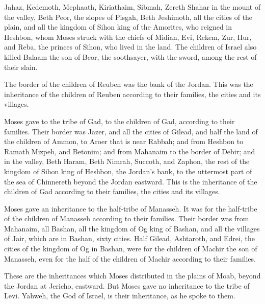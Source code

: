 {Jahaz, Kedemoth, Mephaath,
Kiriathaim, Sibmah, Zereth Shahar in the mount of the valley,
Beth Peor, the slopes of Pisgah, Beth Jeshimoth,
all the cities of the plain, and all the kingdom of Sihon king of the Amorites, who reigned in Heshbon, whom Moses struck with the chiefs of Midian, Evi, Rekem, Zur, Hur, and Reba, the princes of Sihon, who lived in the land.
The children of Israel also killed Balaam the son of Beor, the soothsayer, with the sword, among the rest of their slain.
\par }{\PP {}The border of the children of Reuben was the bank of the Jordan. This was the inheritance of the children of Reuben according to their families, the cities and its villages.
\par }{\PP {}Moses gave to the tribe of Gad, to the children of Gad, according to their families.
Their border was Jazer, and all the cities of Gilead, and half the land of the children of Ammon, to Aroer that is near Rabbah;
and from Heshbon to Ramath Mizpeh, and Betonim; and from Mahanaim to the border of Debir;
and in the valley, Beth Haram, Beth Nimrah, Succoth, and Zaphon, the rest of the kingdom of Sihon king of Heshbon, the Jordan’s bank, to the uttermost part of the sea of Chinnereth beyond the Jordan eastward.
This is the inheritance of the children of Gad according to their families, the cities and its villages.
\par }{\PP {}Moses gave an inheritance to the half-tribe of Manasseh. It was for the half-tribe of the children of Manasseh according to their families.
Their border was from Mahanaim, all Bashan, all the kingdom of Og king of Bashan, and all the villages of Jair, which are in Bashan, sixty cities.
Half Gilead, Ashtaroth, and Edrei, the cities of the kingdom of Og in Bashan, were for the children of Machir the son of Manasseh, even for the half of the children of Machir according to their families.
\par }{\PP {}These are the inheritances which Moses distributed in the plains of Moab, beyond the Jordan at Jericho, eastward.
But Moses gave no inheritance to the tribe of Levi. Yahweh, the God of Israel, is their inheritance, as he spoke to them.

}
